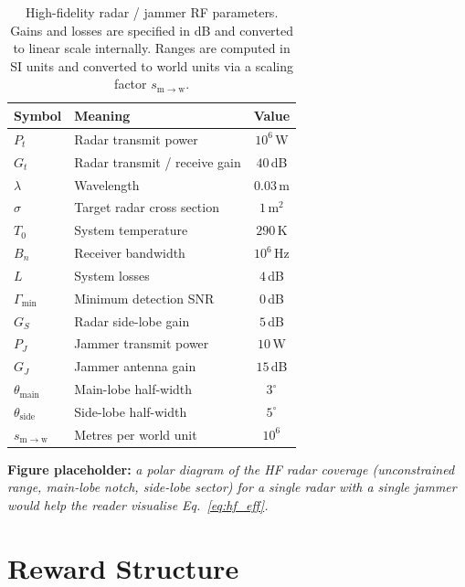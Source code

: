 \begin{table}[H]
\centering
\caption{High-fidelity radar / jammer RF parameters. Gains and losses are
specified in dB and converted to linear scale internally. Ranges are computed
in SI units and converted to world units via a scaling factor
$s_{\mathrm{m}\to\mathrm{w}}$.}
\label{tab:hf_params}
\begin{tabular}{@{}llc@{}}
\toprule
Symbol & Meaning & Value \\ \midrule
$P_t$         & Radar transmit power                    & $10^{6}$\,W \\
$G_t$         & Radar transmit / receive gain           & $40$\,dB \\
$\lambda$     & Wavelength                              & $0.03$\,m \\
$\sigma$      & Target radar cross section              & $1$\,m$^{2}$ \\
$T_0$         & System temperature                      & $290$\,K \\
$B_n$         & Receiver bandwidth                      & $10^{6}$\,Hz \\
$L$           & System losses                           & $4$\,dB \\
$\Gamma_{\min}$ & Minimum detection SNR                 & $0$\,dB \\
$G_{S}$       & Radar side-lobe gain                    & $5$\,dB \\
$P_J$         & Jammer transmit power                   & $10$\,W \\
$G_J$         & Jammer antenna gain                     & $15$\,dB \\
$\theta_{\mathrm{main}}$ & Main-lobe half-width         & $3^{\circ}$ \\
$\theta_{\mathrm{side}}$ & Side-lobe half-width         & $5^{\circ}$ \\
$s_{\mathrm{m}\to\mathrm{w}}$ & Metres per world unit  & $10^{6}$ \\
\bottomrule
\end{tabular}
\end{table}

\textbf{Figure placeholder:} \emph{a polar diagram of the HF radar coverage
(unconstrained range, main-lobe notch, side-lobe sector) for a single radar
with a single jammer would help the reader visualise
Eq.~\eqref{eq:hf_eff}.}

\section{Reward Structure}
\label{sec:rewards}


